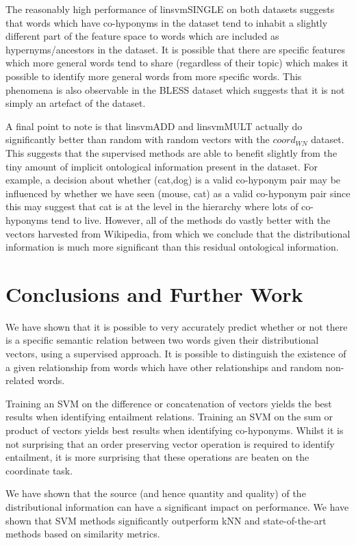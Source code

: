 \documentclass[11pt]{article}
\begin{document}
The reasonably high performance of linsvmSINGLE on both datasets suggests that words which have co-hyponyms in the dataset tend to inhabit a slightly different part of the feature space to words which are included as hypernyms/ancestors in the dataset.  It is possible that there are specific features which more general words tend to share (regardless of their topic) which makes it possible to identify more general words from more specific words.  This phenomena is also observable in the BLESS dataset which suggests that it is not simply an artefact of the dataset.

A final point to note is that linsvmADD and linsvmMULT actually do significantly better than random with random vectors with the $coord_{WN}$ dataset.  This suggests that the supervised methods are able to benefit slightly from the tiny amount of implicit ontological information present in the dataset.  For example, a decision about whether (cat,dog) is a valid co-hyponym pair may be influenced by whether we have seen (mouse, cat) as a valid co-hyponym pair since this may suggest that cat is at the level in the hierarchy where lots of co-hyponyms tend to live.  However, all of the methods do vastly better with the vectors harvested from Wikipedia, from which we conclude that the distributional information is much more significant than this residual ontological information.

\section{Conclusions and Further Work}

We have shown that it is possible to very accurately predict whether
or not there is a specific semantic relation between two words given
their distributional vectors, using a supervised approach.
It is possible to distinguish the existence of a given relationship
from words which have other relationships and random non-related
words.

Training an SVM on the difference or concatenation of vectors yields the best results when identifying entailment relations.  Training an SVM on the sum or product of vectors yields best results when identifying co-hyponyms.  Whilst it is not surprising that an order preserving vector operation is required to identify entailment, it is more surprising that these operations are beaten on the coordinate task.  

We have shown that the source (and hence quantity and quality) of the distributional information can have a significant impact on performance.  We have shown that SVM methods significantly outperform kNN and state-of-the-art methods based on similarity metrics. 











\end{document}
